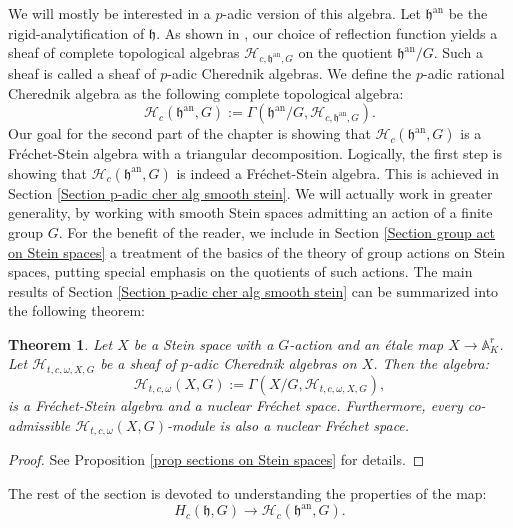 \documentclass{amsart}
\newtheorem{intteo}{Theorem}
\begin{document}
We will mostly be interested in a $p$-adic version of this algebra. Let $\mathfrak{h}^{\operatorname{an}}$ be the rigid-analytification of $\mathfrak{h}$. As shown in \cite{p-adicCheralg}, our choice of reflection function  yields a sheaf of complete topological algebras $\mathcal{H}_{c,\mathfrak{h}^{\operatorname{an}},G}$ on the quotient $\mathfrak{h}^{\operatorname{an}}/G$. Such a sheaf is called a sheaf of $p$-adic Cherednik algebras. We define the $p$-adic rational Cherednik algebra as the following complete topological algebra:
\begin{equation*}
    \mathcal{H}_c(\mathfrak{h}^{\operatorname{an}},G):=\Gamma(\mathfrak{h}^{\operatorname{an}}/G,\mathcal{H}_{c,\mathfrak{h}^{\operatorname{an}},G}).
\end{equation*}
Our goal for the second part of the chapter is showing that $\mathcal{H}_c(\mathfrak{h}^{\operatorname{an}},G)$ is a Fréchet-Stein algebra with a triangular decomposition. Logically, the first step is showing that $\mathcal{H}_c(\mathfrak{h}^{\operatorname{an}},G)$ is indeed a Fréchet-Stein algebra. This is achieved in Section \ref{Section p-adic cher alg smooth stein}. We will actually work in greater generality, by working with smooth Stein spaces admitting an action of a finite group $G$. For the benefit of the reader, we include in Section \ref{Section group act on Stein spaces} a treatment of the basics of the theory of group actions on Stein spaces, putting special emphasis on the quotients of such actions. The main results of Section 
\ref{Section p-adic cher alg smooth stein} can be summarized into the following theorem:
\begin{intteo}
Let $X$ be a Stein space with a $G$-action and an étale map $X\rightarrow\mathbb{A}^r_K$. Let $\mathcal{H}_{t,c,\omega,X,G}$ be a sheaf of $p$-adic Cherednik algebras on $X$. Then the algebra:
\begin{equation*}
\mathcal{H}_{t,c,\omega}(X,G):=    \Gamma(X/G,\mathcal{H}_{t,c,\omega,X,G}),
\end{equation*}
is a Fréchet-Stein algebra and a nuclear Fréchet space. Furthermore, every co-admissible $\mathcal{H}_{t,c,\omega}(X,G)$-module is also a nuclear Fréchet space.
\end{intteo}
\begin{proof}
See Proposition \ref{prop sections on Stein spaces} for details.    
\end{proof}
The rest of the section is devoted to understanding the properties of the  map:
\begin{equation*}
  H_{c}(\mathfrak{h},G)\rightarrow  \mathcal{H}_{c}(\mathfrak{h}^{\operatorname{an}},G).
\end{equation*}
\end{document}
